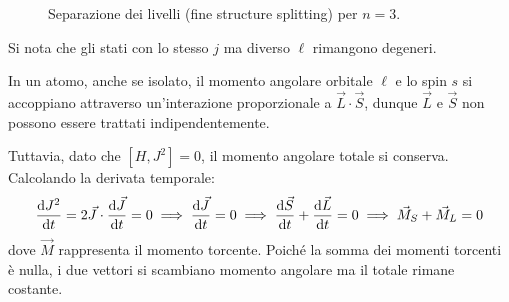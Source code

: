 \begin{exercise}
\begin{solution}
\begin{figure}[H]
    \centering
    \caption{Separazione dei livelli (fine structure splitting) per \( n=3 \).}
\end{figure}

\begin{remark}
     Si nota che gli stati con lo stesso \( j \) ma diverso \( \ell \) rimangono degeneri.
\end{remark}
In un atomo, anche se isolato, il momento angolare orbitale \( \ell \) e lo spin \( s \) si accoppiano attraverso un'interazione proporzionale a \( \vec{L} \cdot \vec{S} \), 
dunque \(\vec{L}\) e \(\vec{S}\) non possono essere trattati indipendentemente.

Tuttavia, dato che \(\left[ H, J^2 \right]=0\), il momento angolare totale si conserva. Calcolando la derivata temporale:
\begin{equation}
    \dv{J^2}{t} = 2\vec{J} \cdot \dv{\vec{J}}{t} = 0 \implies \dv{\vec{J}}{t}  = 0 \implies \dv{\vec{S}}{t}  + \dv{\vec{L}}{t}  = 0 \implies \vec{M}_S + \vec{M}_L = 0
\end{equation}
dove \( \vec{M} \) rappresenta il momento torcente. Poiché la somma dei momenti torcenti è nulla, i due vettori si scambiano momento angolare ma il totale rimane costante.


\end{solution}
\end{exercise}
